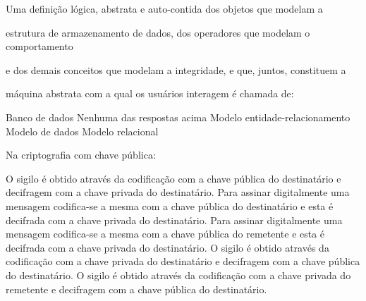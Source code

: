 \documentclass[12pt, addpoints]{exam}
\begin{document}
\begin{questions}
\question

Uma definição lógica, abstrata e auto-contida dos objetos que modelam a

estrutura de armazenamento de dados, dos operadores que modelam o comportamento

e dos demais conceitos que modelam a integridade, e que, juntos, constituem a

máquina abstrata com a qual os usuários interagem é chamada de:


\begin{choices}
\choice Banco de dados
\choice Nenhuma das respostas acima
\choice Modelo entidade-relacionamento
\choice Modelo de dados
\choice Modelo relacional
\end{choices}

\question

Na criptografia com chave pública:


\begin{choices}
\choice O sigilo é obtido através da codificação com a chave pública do destinatário e decifragem com a chave privada do destinatário.
\choice Para assinar digitalmente uma mensagem codifica-se a mesma com a chave pública do destinatário e esta é decifrada com a chave privada do destinatário.
\choice Para assinar digitalmente uma mensagem codifica-se a mesma com a chave pública do remetente e esta é decifrada com a chave privada do destinatário.
\choice O sigilo é obtido através da codificação com a chave privada do destinatário e decifragem com a chave pública do destinatário.
\choice O sigilo é obtido através da codificação com a chave privada do remetente e decifragem com a chave pública do destinatário.
\end{choices}



    \end{questions}
    
\end{document}
